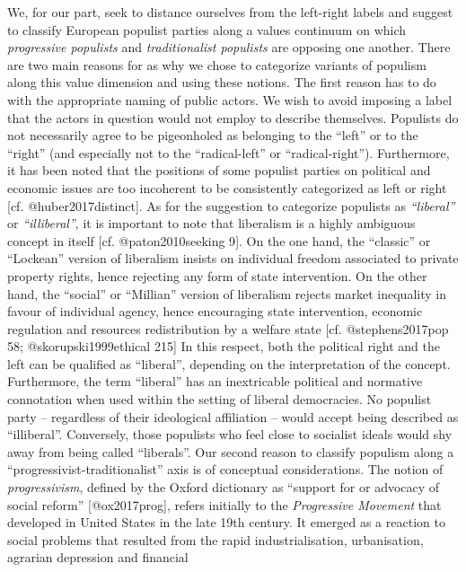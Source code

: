 \documentclass[]{article}
\begin{document}
We, for our part, seek to distance ourselves from the left-right labels
and suggest to classify European populist parties along a values
continuum on which \emph{progressive populists} and \emph{traditionalist
populists} are opposing one another. There are two main reasons for as
why we chose to categorize variants of populism along this value
dimension and using these notions. The first reason has to do with the
appropriate naming of public actors. We wish to avoid imposing a label
that the actors in question would not employ to describe themselves.
Populists do not necessarily agree to be pigeonholed as belonging to the
``left'' or to the ``right'' (and especially not to the ``radical-left''
or ``radical-right''). Furthermore, it has been noted that the positions
of some populist parties on political and economic issues are too
incoherent to be consistently categorized as left or right {[}cf.
@huber2017distinct{]}. As for the suggestion to categorize populists as
\emph{``liberal''} or \emph{``illiberal''}, it is important to note that
liberalism is a highly ambiguous concept in itself {[}cf.
@paton2010seeking 9{]}. On the one hand, the ``classic'' or ``Lockean''
version of liberalism insists on individual freedom associated to
private property rights, hence rejecting any form of state intervention.
On the other hand, the ``social'' or ``Millian'' version of liberalism
rejects market inequality in favour of individual agency, hence
encouraging state intervention, economic regulation and resources
redistribution by a welfare state {[}cf. @stephens2017pop 58;
@skorupski1999ethical 215{]} In this respect, both the political right
and the left can be qualified as ``liberal'', depending on the
interpretation of the concept. Furthermore, the term ``liberal'' has an
inextricable political and normative connotation when used within the
setting of liberal democracies. No populist party -- regardless of their
ideological affiliation -- would accept being described as
``illiberal''. Conversely, those populists who feel close to socialist
ideals would shy away from being called ``liberals''. Our second reason
to classify populism along a ``progressivist-traditionalist'' axis is of
conceptual considerations. The notion of \emph{progressivism}, defined
by the Oxford dictionary as ``support for or advocacy of social reform''
{[}@ox2017prog{]}, refers initially to the \emph{Progressive Movement}
that developed in United States in the late 19th century. It emerged as
a reaction to social problems that resulted from the rapid
industrialisation, urbanisation, agrarian depression and financial
\end{document}
